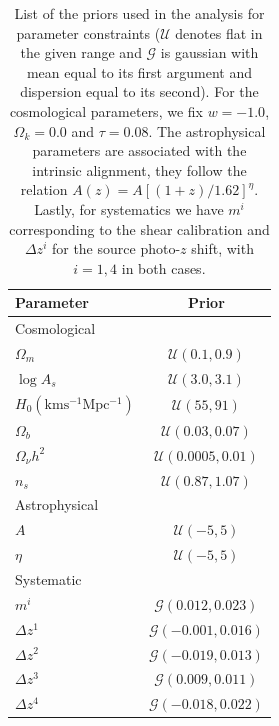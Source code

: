 \documentclass[twocolumn]{\docclass}
\begin{document}
	\begin{table}
		\centering
		\begin{tabular} { l c} 
			\hline
			\hline
			Parameter							& Prior	\\ \hline
			Cosmological & \\ [1ex]
			$\Omega_m$						& $\mathcal{U}(0.1, 0.9)$		\\
			$\log A_s$					& $\mathcal{U}(3.0, 3.1)$		\\
			$H_0 \mathrm{(km s^{-1} Mpc^{-1})}$	& $\mathcal{U}(55, 91)$		\\
			$\Omega_b$						& $\mathcal{U}(0.03, 0.07)$	\\
			$\Omega_\nu h^2$					& $\mathcal{U}(0.0005, 0.01)$	\\
			$n_s$							& $\mathcal{U}(0.87, 1.07)$	\\ [1ex]
			\hline
			Astrophysical & \\ [1ex]
			$A$								& $\mathcal{U}(-5, 5)$ \\
			$\eta$							& $\mathcal{U}(-5, 5)$ \\ [1ex]
			\hline
			Systematic & \\ [1ex]
			$m^i$							& $\mathcal{G}(0.012, 0.023)$	 \\
			$\Delta z^1$						& $\mathcal{G}(-0.001, 0.016)$	 \\
			$\Delta z^2$						& $\mathcal{G}(-0.019, 0.013)$	 \\
			$\Delta z^3$						& $\mathcal{G}(0.009, 0.011)$	 \\
			$\Delta z^4$						& $\mathcal{G}(-0.018, 0.022)$	 \\ [1ex]
			\hline
			\hline
		\end{tabular}
		\caption{List of the priors used in the analysis for parameter constraints ($\mathcal{U}$ denotes flat in the given range and $\mathcal{G}$ is gaussian with mean equal to its first argument and dispersion equal to its second). For the cosmological parameters, we fix $w = -1.0$, $\Omega_k =  0.0$ and $\tau =  0.08$. The astrophysical parameters are associated with the intrinsic alignment, they follow the relation $A(z) = A[(1+z)/1.62]^{\eta}$. Lastly, for systematics we have $m^i$ corresponding to the shear calibration and  $\Delta z^i$ for the source photo-$z$ shift, with $i = 1, 4$ in both cases.}
		\label{tab:constraints}
	\end{table}
	
\end{document}
